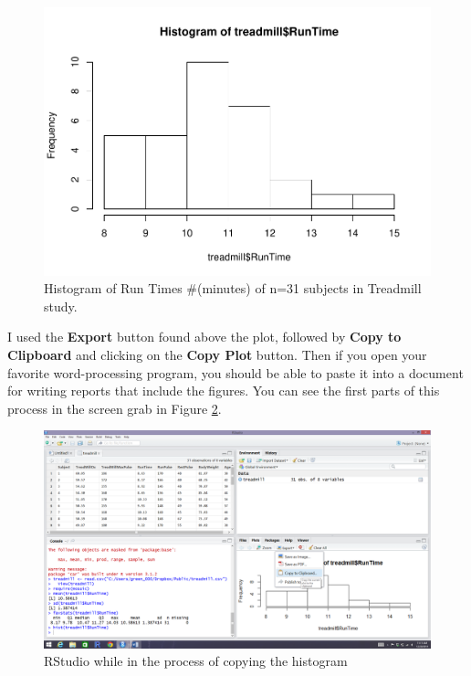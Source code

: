 \documentclass[]{book}
\newenvironment{Shaded}{\begin{snugshade}}{\end{snugshade}}
\newcommand{\KeywordTok}[1]{\textcolor[rgb]{0.13,0.29,0.53}{\textbf{#1}}}
\newcommand{\OperatorTok}[1]{\textcolor[rgb]{0.81,0.36,0.00}{\textbf{#1}}}
\newcommand{\NormalTok}[1]{#1}
\begin{document}
\begin{Shaded}
\end{Shaded}

\begin{figure}
\centering
\includegraphics{GreenwoodBanner_files/figure-latex/Figure5-1.pdf}
\caption{\label{fig:Figure5}Histogram of Run Times \#(minutes) of n=31 subjects in
Treadmill study.}
\end{figure}

I used the \textbf{Export} button found above the plot, followed by
\textbf{Copy to Clipboard} and clicking on the \textbf{Copy Plot}
button. Then if you open your favorite word-processing program, you
should be able to paste it into a document for writing reports that
include the figures. You can see the first parts of this process in the
screen grab in Figure \ref{fig:Figure6}.



\begin{figure}
\includegraphics[width=26.67in]{chapter0_files/image010} \caption{RStudio while in the process of copying the histogram}\label{fig:Figure6}
\end{figure}
\end{document}
